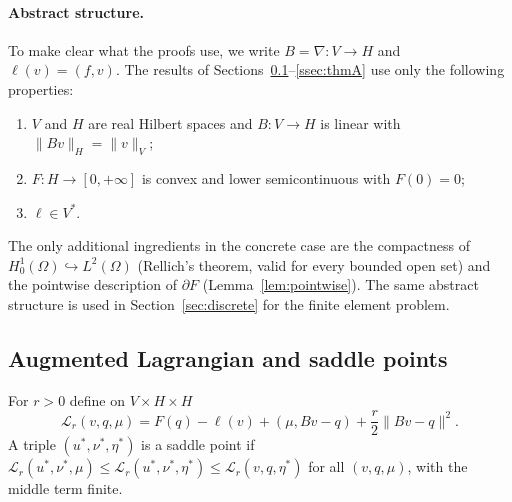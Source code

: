 \documentclass[11pt]{amsart}
\theoremstyle{definition}
\theoremstyle{remark}
\numberwithin{equation}{section}
\newcommand{\Lag}{\mathcal{L}_r}
\newcommand{\norm}[1]{\lVert #1\rVert}
\begin{document}
\paragraph{Abstract structure.}
To make clear what the proofs use, we write $B=\nabla\colon V\to H$ and $\ell(v)=(f,v)$. The results of Sections~\ref{ssec:saddle}--\ref{ssec:thmA} use only the following properties:
\begin{enumerate}[label=(A\arabic*),leftmargin=2.8em]
\item\label{A1} $V$ and $H$ are real Hilbert spaces and $B\colon V\to H$ is linear with $\norm{Bv}_H=\norm v_V$;
\item\label{A2} $F\colon H\to[0,+\infty]$ is convex and lower semicontinuous with $F(0)=0$;
\item\label{A3} $\ell\in V^*$.
\end{enumerate}
The only additional ingredients in the concrete case are the compactness of $H^1_0(\Omega)\hookrightarrow L^2(\Omega)$ (Rellich's theorem, valid for every bounded open set) and the pointwise description of $\partial F$ (Lemma~\ref{lem:pointwise}). The same abstract structure is used in Section~\ref{sec:discrete} for the finite element problem.

\subsection{Augmented Lagrangian and saddle points}\label{ssec:saddle}
For $r>0$ define on $V\times H\times H$
\[
\Lag(v,q,\mu)=F(q)-\ell(v)+(\mu,Bv-q)+\frac r2\norm{Bv-q}^2 .
\]
A triple $(u^*,\nu^*,\eta^*)$ is a saddle point if $\Lag(u^*,\nu^*,\mu)\le\Lag(u^*,\nu^*,\eta^*)\le\Lag(v,q,\eta^*)$ for all $(v,q,\mu)$, with the middle term finite.
\end{document}
